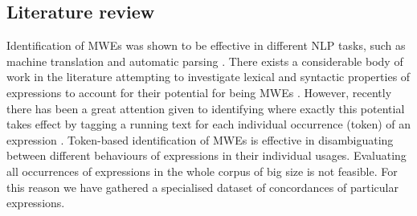 \documentclass[output=paper,modfonts,nonflat]{langsci/langscibook}
\begin{document}



\subsection{Literature review}

Identification of MWEs was shown to be effective in different NLP tasks, such as machine translation \citep{pal2011} and automatic parsing \citep{Constant2012}.
There exists a considerable body of work in the literature attempting to investigate lexical and syntactic properties of expressions to account for their potential for being MWEs \citep{ramisch2014multiword,baldwin2010multiword}. 
However, recently there has been a great attention given to identifying where exactly this potential takes effect by tagging a running text for each individual occurrence (token) of an expression \citep{Schneider14b,constant2012evaluating,Gharbieh2017}. 
Token-based identification of MWEs is effective in disambiguating between different behaviours of expressions in their individual usages. 
Evaluating all occurrences of expressions in the whole corpus of big size is not feasible. For this reason we have gathered a specialised dataset of concordances of particular expressions.
\end{document}
